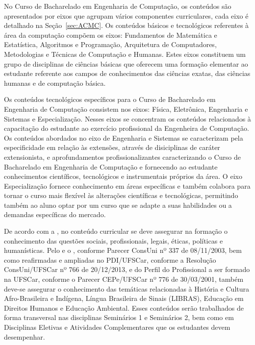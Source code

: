 No Curso de Bacharelado em Engenharia de Computação, os conteúdos são apresentados por eixos que agrupam vários componentes curriculares, cada eixo é detalhado na Seção~\ref{sec:ACMC}. Os conteúdos básicos e tecnológicos referentes à área da computação compõem os eixos: Fundamentos de Matemática e Estatística, Algoritmos e Programação, Arquitetura de Computadores, Metodologias e Técnicas de Computação e Humanas. Estes eixos constituem um grupo de disciplinas de ciências básicas que oferecem uma formação elementar ao estudante referente aos campos de conhecimentos das ciências exatas, das ciências humanas e de computação básica.

Os conteúdos tecnológicos específicos para o Curso de Bacharelado em Engenharia de Computação consistem nos eixos: Física, Eletrônica, Engenharia e Sistemas e Especialização. Nesses eixos se concentram os conteúdos relacionados à capacitação do estudante ao exercício profissional da Engenheira de Computação. Os conteúdos abordados no eixo de Engenharia e Sistemas se caracterizam pela especificidade em relação às extensões, através de disiciplinas de caráter extensionista, e aprofundamentos profissionalizantes caracterizando o Curso de Bacharelado em Engenharia de Computação e fornecendo ao estudante conhecimentos científicos, tecnológicos e instrumentais próprios da área. O eixo Especialização fornece conhecimento em áreas específicas e também colabora para tornar o curso mais flexível às alterações científicas e tecnológicas, permitindo também ao aluno optar por um curso que se adapte a suas habilidades ou a demandas específicas do mercado.

De acordo com a , no conteúdo curricular se deve assegurar na formação o conhecimento das questões sociais, profissionais, legais, éticas, políticas e humanísticas. Pelo  e o , conforme Parecer ConsUni nº 337 de 08/11/2003, bem como reafirmadas e ampliadas no PDI/UFSCar, conforme a Resolução ConsUni/UFSCar nº 766 de 20/12/2013, e do Perfil do Profissional a ser formado na UFSCar, conforme o Parecer CEPe/UFSCar nº 776 de 30/03/2001, também deve-se assegurar o conhecimento das temáticas relacionadas à História e Cultura Afro-Brasileira e Indígena, Língua Brasileira de Sinais (LIBRAS), Educação em Direitos Humanos e Educação Ambiental.
Esses conteúdos serão trabalhados de forma transversal nas disciplinas Seminários 1 e Seminários 2, bem como em Disciplinas Eletivas e Atividades Complementares que os estudantes devem desempenhar. %

